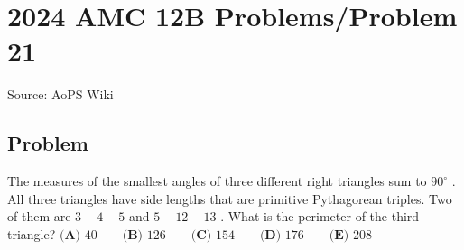 \documentclass[12pt]{article}
\begin{document}
\section*{{2024 AMC 12B Problems/Problem 21}}
Source: AoPS Wiki

\subsection*{Problem}
The measures of the smallest angles of three different right triangles sum to $90^\circ$ . All three triangles have side lengths that are primitive Pythagorean triples. Two of them are $3-4-5$ and $5-12-13$ . What is the perimeter of the third triangle? $\textbf{(A) } 40 \qquad\textbf{(B) } 126 \qquad\textbf{(C) } 154 \qquad\textbf{(D) } 176 \qquad\textbf{(E) } 208$
\end{document}
